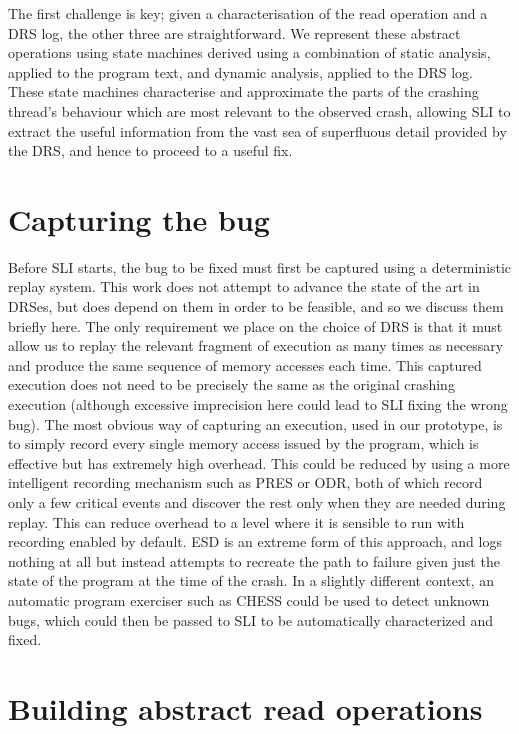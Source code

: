 \documentclass[10pt,twocolumn,preprint,natbib,authoryear]{sigplanconf}
\newcommand{\editorial}[1]{}
\begin{document}
The first challenge is key; given a characterisation of the read
operation and a DRS log, the other three are straightforward.  We
represent these abstract operations using state machines derived using
a combination of static analysis, applied to the program text, and
dynamic analysis, applied to the DRS log.  These state machines
characterise and approximate the parts of the crashing thread's
behaviour which are most relevant to the observed crash, allowing SLI
to extract the useful information from the vast sea of superfluous
detail provided by the DRS, and hence to proceed to a useful fix.

\section{Capturing the bug}

Before SLI starts, the bug to be fixed must first be captured using a
deterministic replay system.  This work does not attempt to advance
the state of the art in DRSes, but does depend on them in order to be
feasible, and so we discuss them briefly here.  The only requirement
we place on the choice of DRS is that it must allow us to replay the
relevant fragment of execution as many times as necessary and produce
the same sequence of memory accesses each time.  This captured
execution does not need to be precisely the same as the original
crashing execution (although excessive imprecision here could lead to
SLI fixing the wrong bug).  The most obvious way of capturing an
execution, used in our prototype, is to simply record every single
memory access issued by the program, which is effective but has
extremely high overhead.  This could be reduced by using a more
intelligent recording mechanism such as PRES or ODR\cite{Altekar2009},
both of which record only a few critical events and discover the rest
only when they are needed during replay.  This can reduce overhead to
a level where it is sensible to run with recording enabled by default.
ESD\cite{Zamfir2010} is an extreme form of this approach, and logs
nothing at all but instead attempts to recreate the path to failure
given just the state of the program at the time of the crash.  In a
slightly different context, an automatic program exerciser such as
CHESS\cite{Musuvathi2008} could be used to detect unknown bugs, which
could then be passed to SLI to be automatically characterized and
fixed.\editorial{I want to use the phrase closed-loop here}

\section{Building abstract read operations}
\label{sect:build_state_machines}
\end{document}
